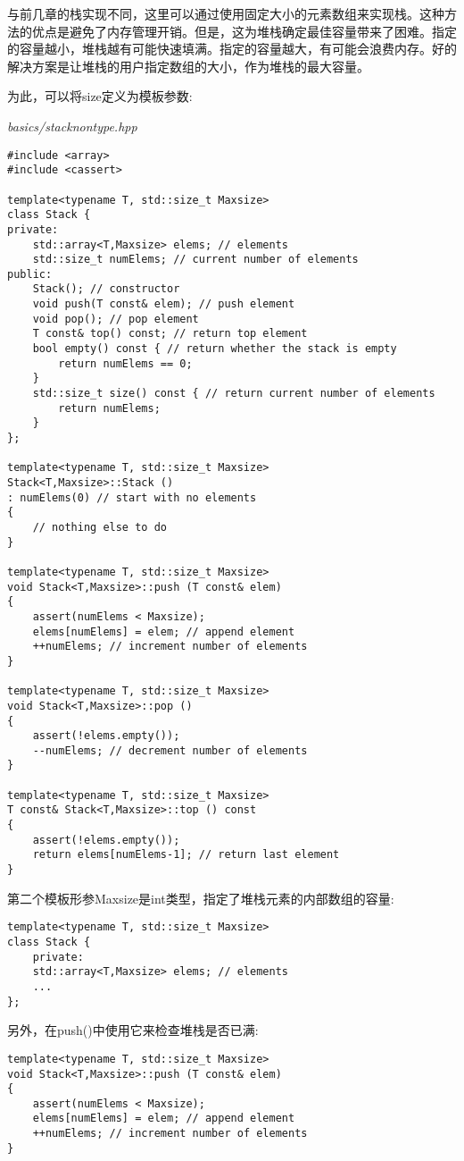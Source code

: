 与前几章的栈实现不同，这里可以通过使用固定大小的元素数组来实现栈。这种方法的优点是避免了内存管理开销。但是，这为堆栈确定最佳容量带来了困难。指定的容量越小，堆栈越有可能快速填满。指定的容量越大，有可能会浪费内存。好的解决方案是让堆栈的用户指定数组的大小，作为堆栈的最大容量。

为此，可以将size定义为模板参数:

\noindent
\textit{basics/stacknontype.hpp}
\begin{lstlisting}[style=styleCXX]
#include <array>
#include <cassert>

template<typename T, std::size_t Maxsize>
class Stack {
private:
	std::array<T,Maxsize> elems; // elements
	std::size_t numElems; // current number of elements
public:
	Stack(); // constructor
	void push(T const& elem); // push element
	void pop(); // pop element
	T const& top() const; // return top element
	bool empty() const { // return whether the stack is empty
		return numElems == 0;
	}
	std::size_t size() const { // return current number of elements
		return numElems;
	}
};

template<typename T, std::size_t Maxsize>
Stack<T,Maxsize>::Stack ()
: numElems(0) // start with no elements
{
	// nothing else to do
}

template<typename T, std::size_t Maxsize>
void Stack<T,Maxsize>::push (T const& elem)
{
	assert(numElems < Maxsize);
	elems[numElems] = elem; // append element
	++numElems; // increment number of elements
}

template<typename T, std::size_t Maxsize>
void Stack<T,Maxsize>::pop ()
{
	assert(!elems.empty());
	--numElems; // decrement number of elements
}

template<typename T, std::size_t Maxsize>
T const& Stack<T,Maxsize>::top () const
{
	assert(!elems.empty());
	return elems[numElems-1]; // return last element
}
\end{lstlisting}

第二个模板形参Maxsize是int类型，指定了堆栈元素的内部数组的容量:

\begin{lstlisting}[style=styleCXX]
template<typename T, std::size_t Maxsize>
class Stack {
	private:
	std::array<T,Maxsize> elems; // elements
	...
};
\end{lstlisting}

另外，在push()中使用它来检查堆栈是否已满:

\begin{lstlisting}[style=styleCXX]
template<typename T, std::size_t Maxsize>
void Stack<T,Maxsize>::push (T const& elem)
{
	assert(numElems < Maxsize);
	elems[numElems] = elem; // append element
	++numElems; // increment number of elements
}
\end{lstlisting}

